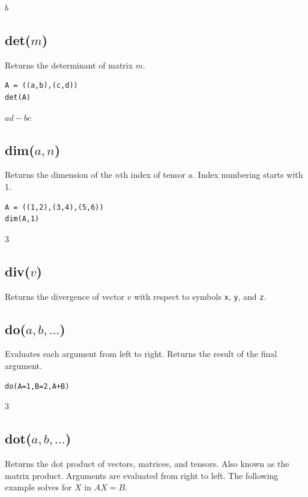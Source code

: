 \documentclass[12pt]{article}
\begin{document}
\noindent
$b$

\subsection*{det($m$)}

Returns the determinant of matrix $m$.

{\color{blue}
\begin{verbatim}
A = ((a,b),(c,d))
det(A)
\end{verbatim}
}

\noindent
$a d - b c$

\subsection*{dim($a,n$)}

Returns the dimension of the $n$th index of tensor $a$.
Index numbering starts with 1.

{\color{blue}
\begin{verbatim}
A = ((1,2),(3,4),(5,6))
dim(A,1)
\end{verbatim}
}

\noindent
$3$

\subsection*{div($v$)}

Returns the divergence of vector $v$ with respect to symbols \verb$x$, \verb$y$, and \verb$z$.

\subsection*{do($a,b,\ldots$)}

Evaluates each argument from left to right.
Returns the result of the final argument.

{\color{blue}
\begin{verbatim}
do(A=1,B=2,A+B)
\end{verbatim}
}

\noindent
$3$

\subsection*{dot($a,b,\ldots$)}

Returns the dot product of vectors, matrices, and tensors.
Also known as the matrix product.
Arguments are evaluated from right to left.
The following example solves for $X$ in $AX=B$.
\end{document}
